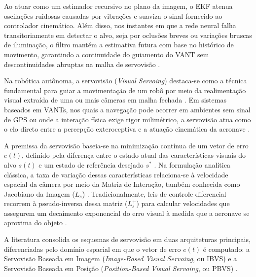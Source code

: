 Ao atuar como um estimador recursivo no plano da imagem, o EKF atenua oscilações ruidosas causadas por vibrações e suaviza o sinal fornecido ao controlador cinemático. Além disso, nos instantes em que a rede neural falha transitoriamente em detectar o alvo, seja por oclusões breves ou variações bruscas de iluminação, o filtro mantém a estimativa futura com base no histórico de movimento, garantindo a continuidade do guiamento do VANT sem descontinuidades abruptas na malha de servovisão \cite{barisic2019, vidal2007}.


Na robótica autônoma, a servovisão (\textit{Visual Servoing}) destaca-se como a técnica fundamental para guiar a movimentação de um robô por meio da realimentação visual extraída de uma ou mais câmeras em malha fechada \cite{thuilot2002}. Em sistemas baseados em VANTs, nos quais a navegação pode ocorrer em ambientes sem sinal de GPS ou onde a interação física exige rigor milimétrico, a servovisão atua como o elo direto entre a percepção exteroceptiva e a atuação cinemática da aeronave \cite{shang2016, lopezfranco2017}.

A premissa da servovisão baseia-se na minimização contínua de um vetor de erro $e(t)$, definido pela diferença entre o estado atual das características visuais do alvo $s(t)$ e um estado de referência desejado $s^{*}$ \cite{lopezfranco2017, pramono2025}. Na formulação analítica clássica, a taxa de variação dessas características relaciona-se à velocidade espacial da câmera por meio da Matriz de Interação, também conhecida como Jacobiano da Imagem ($L_s$) \cite{luo2020}. Tradicionalmente, leis de controle diferencial recorrem à pseudo-inversa dessa matriz ($L_s^{+}$) para calcular velocidades que assegurem um decaimento exponencial do erro visual à medida que a aeronave se aproxima do objeto \cite{lopezfranco2017, luo2020}.

A literatura consolida os esquemas de servovisão em duas arquiteturas principais, diferenciadas pelo domínio espacial em que o vetor de erro $e(t)$ é computado: a Servovisão Baseada em Imagem (\textit{Image-Based Visual Servoing}, ou IBVS) e a Servovisão Baseada em Posição (\textit{Position-Based Visual Servoing}, ou PBVS) \cite{hutchinson1996, chaumette2016, thuilot2002, hafez2013}.

